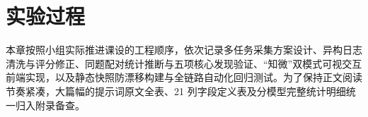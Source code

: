 \chapter{实验过程}\label{part:process}

本章按照小组实际推进课设的工程顺序，依次记录多任务采集方案设计、异构日志清洗与评分修正、同题配对统计推断与五项核心发现验证、“知微”双模式可视交互前端实现，以及静态快照防漂移构建与全链路自动化回归测试。为了保持正文阅读节奏紧凑，大篇幅的提示词原文全表、21 列字段定义表及分模型完整统计明细统一归入附录备查。








